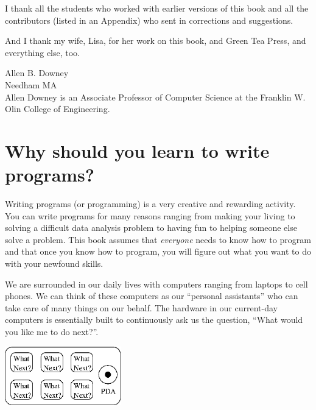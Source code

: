 \documentclass[11pt]{book}
\begin{document}
I thank all the students who worked with earlier
versions of this book and all the contributors (listed
in an Appendix) who sent in corrections and suggestions.

And I thank my wife, Lisa, for her work on this book, and Green
Tea Press, and everything else, too.

Allen B. Downey \\
Needham MA\\

Allen Downey is an Associate Professor of Computer Science at 
the Franklin W. Olin College of Engineering.


\clearemptydoublepage

\begin{latexonly}

\tableofcontents

\clearemptydoublepage

\end{latexonly}

\mainmatter

\chapter{Why should you learn to write programs?}

Writing programs (or programming) is a very creative 
and rewarding activity.  You can write programs for 
many reasons ranging from making your living to solving
a difficult data analysis problem to having fun to helping
someone else solve a problem.  This book assumes that 
\emph{everyone} needs to know how to program and that once 
you know how to program, you will figure out what you want 
to do with your newfound skills.  

We are surrounded in our daily lives with computers ranging 
from laptops to cell phones.  We can think of these computers
as our ``personal assistants'' who can take care of many things
on our behalf.  The hardware in our current-day computers 
is essentially built to continuously ask us the question, 
``What would you like me to do next?''.

\beforefig
\centerline{\includegraphics[height=1.00in]{figs2/pda.eps}}
\afterfig
\end{document}
